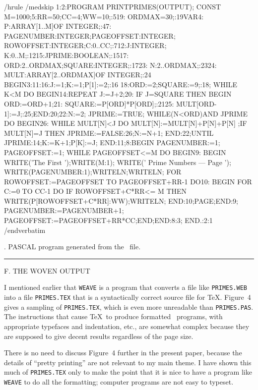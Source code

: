 \rightfloat
\ttverbatim
/hrule
/medskip
{1:}{2:}PROGRAM PRINTPRIMES(OUTPUT);
CONST M=1000;{5:}RR=50;CC=4;WW=10;{:5}{19:}
ORDMAX=30;{:19}VAR{4:}
P:ARRAY[1..M]OF INTEGER;{:4}{7:}
PAGENUMBER:INTEGER;PAGEOFFSET:INTEGER;
ROWOFFSET:INTEGER;C:0..CC;{:7}{12:}J:INTEGER;
K:0..M;{:12}{15:}JPRIME:BOOLEAN;{:15}{17:}
ORD:2..ORDMAX;SQUARE:INTEGER;{:17}{23:}
N:2..ORDMAX;{:23}{24:}
MULT:ARRAY[2..ORDMAX]OF INTEGER;{:24}
BEGIN{3:}{11:}{16:}J:=1;K:=1;P[1]:=2;{:16}
{18:}ORD:=2;SQUARE:=9;{:18};
WHILE K<M DO BEGIN{14:}REPEAT J:=J+2;{20:}
IF J=SQUARE THEN BEGIN ORD:=ORD+1;{21:}
SQUARE:=P[ORD]*P[ORD];{:21}{25:}
MULT[ORD-1]:=J;{:25};END{:20};{22:}N:=2;
JPRIME:=TRUE;
WHILE(N<ORD)AND JPRIME DO BEGIN{26:}
WHILE MULT[N]<J DO MULT[N]:=MULT[N]+P[N]+P[N]
;IF MULT[N]=J THEN JPRIME:=FALSE{:26};N:=N+1;
END{:22};UNTIL JPRIME{:14};K:=K+1;P[K]:=J;
END{:11};{8:}BEGIN PAGENUMBER:=1;
PAGEOFFSET:=1;
WHILE PAGEOFFSET<=M DO BEGIN{9:}
BEGIN WRITE('The First ');WRITE(M:1);
WRITE(' Prime Numbers --- Page ');
WRITE(PAGENUMBER:1);WRITELN;WRITELN;
FOR ROWOFFSET:=PAGEOFFSET TO PAGEOFFSET+RR-1
DO{10:}
BEGIN FOR C:=0 TO CC-1 DO IF ROWOFFSET+C*RR<=
M THEN WRITE(P[ROWOFFSET+C*RR]:WW);WRITELN;
END{:10};PAGE;END{:9};
PAGENUMBER:=PAGENUMBER+1;
PAGEOFFSET:=PAGEOFFSET+RR*CC;END;END{:8}{:3};
END.{:2}{:1}
/endverbatim
\medskip
\caption 3. PASCAL program generated from the \WEB\ file.
\medskip
\hrule
\endfloat

\beginsection F. THE WOVEN OUTPUT

I mentioned earlier that {\tt WEAVE} is a program that converts a file
like {\tt PRIMES.WEB} into a file {\tt PRIMES.TEX} that is a syntactically
correct source file for \TeX. Figure~4 gives a sampling of {\tt PRIMES.TEX},
which is even more unreadable than {\tt PRIMES.PAS}. The instructions that
cause \TeX\ to produce formatted \PASCAL\ programs, with appropriate
typefaces and indentation, etc., are somewhat complex because they are
supposed to give decent results regardless of the page size.

There is no need to discuss Figure~4 further in the present paper, because
the details of ``pretty printing'' are not relevant to my main theme.
I have shown this much of {\tt PRIMES.TEX} only to make the point that
it is nice to have a program like {\tt WEAVE} to do all the formatting;
computer programs are not easy to typeset.

